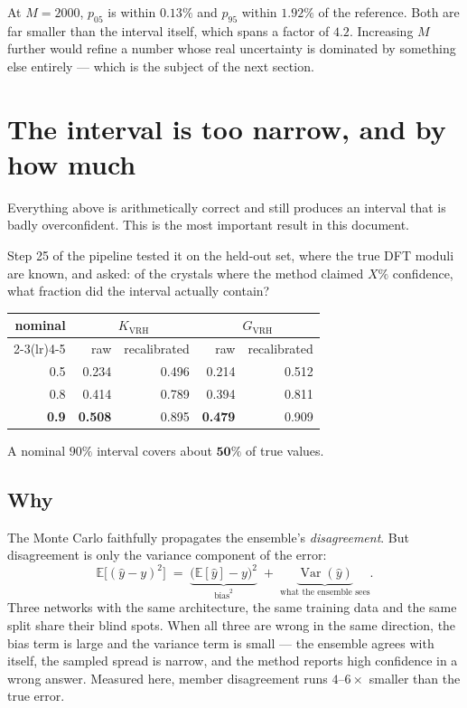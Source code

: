 \documentclass[11pt,a4paper]{article}
\begin{document}
\noindent
At $M = 2000$, $p_{05}$ is within $0.13\%$ and $p_{95}$ within $1.92\%$ of the reference.
Both are far smaller than the interval itself, which spans a factor of $4.2$. Increasing
$M$ further would refine a number whose real uncertainty is dominated by something else
entirely --- which is the subject of the next section.

\section{The interval is too narrow, and by how much}

Everything above is arithmetically correct and still produces an interval that is badly
overconfident. This is the most important result in this document.

Step 25 of the pipeline tested it on the held-out set, where the true DFT moduli are known,
and asked: of the crystals where the method claimed $X\%$ confidence, what fraction did the
interval actually contain?

\begin{center}
\begin{tabular}{@{}rrrrr@{}}
\toprule
nominal & \multicolumn{2}{c}{$K_{\mathrm{VRH}}$} & \multicolumn{2}{c}{$G_{\mathrm{VRH}}$} \\
\cmidrule(lr){2-3}\cmidrule(lr){4-5}
 & raw & recalibrated & raw & recalibrated \\
\midrule
0.5 & 0.234 & 0.496 & 0.214 & 0.512 \\
0.8 & 0.414 & 0.789 & 0.394 & 0.811 \\
\textbf{0.9} & \textbf{0.508} & 0.895 & \textbf{0.479} & 0.909 \\
\bottomrule
\end{tabular}
\end{center}

\noindent
A nominal $90\%$ interval covers about $\mathbf{50\%}$ of true values.

\subsection{Why}

The Monte Carlo faithfully propagates the ensemble's \emph{disagreement}. But disagreement
is only the variance component of the error:
\[
\mathbb{E}\big[(\hat{y}-y)^2\big] \;=\; \underbrace{\big(\mathbb{E}[\hat{y}]-y\big)^2}_{\text{bias}^2} \;+\; \underbrace{\operatorname{Var}(\hat{y})}_{\text{what the ensemble sees}} .
\]
Three networks with the same architecture, the same training data and the same split share
their blind spots. When all three are wrong in the same direction, the bias term is large
and the variance term is small --- the ensemble agrees with itself, the sampled spread is
narrow, and the method reports high confidence in a wrong answer. Measured here, member
disagreement runs $4$--$6\times$ smaller than the true error.
\end{document}
